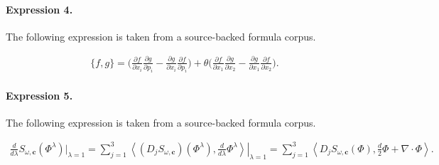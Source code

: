 \documentclass[11pt]{article}
\begin{document}
\paragraph{Expression 4.} The following expression is taken from a source-backed formula corpus.

\begin{align*}\big\{f, g\big\}= \Big(\frac{\partial f}{\partial x_{i}}\frac{\partial g}{\partial p_{i}} - \frac{\partial g}{\partial x_{i}}\frac{\partial f}{\partial p_{i}}\Big) + \theta\Big( \frac{\partial f}{\partial x_{1}}\frac{\partial g}{\partial x_{2}} - \frac{\partial g}{\partial x_{1}}\frac{\partial f}{\partial x_{2}}\Big).\end{align*}

\paragraph{Expression 5.} The following expression is taken from a source-backed formula corpus.

\begin{align*}\frac{d}{d\lambda}S_{\omega,\mathbf{c}}(\Phi^{\lambda})\big|_{\lambda=1}=\sum_{j=1}^3\left.\left\langle (D_jS_{\omega,\mathbf{c}})(\Phi^{\lambda}), \frac{d}{d\lambda}\Phi^{\lambda}\right\rangle\right|_{\lambda =1}=\sum_{j=1}^3\left\langle D_jS_{\omega,\mathbf{c}}(\Phi), \frac{d}{2}\Phi+\nabla \cdot \Phi\right\rangle. \end{align*}
\end{document}
